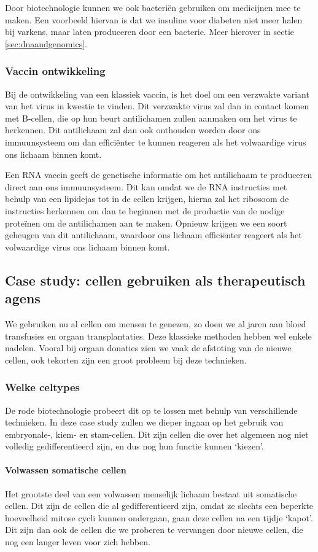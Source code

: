 \documentclass[a4paper,kul]{kulakarticle} %
\begin{document}
Door biotechnologie kunnen we ook bacteriën gebruiken om medicijnen mee te maken. Een voorbeeld hiervan is dat we insuline voor diabeten niet meer halen bij varkens, maar laten produceren door een bacterie. Meer hierover in sectie \ref{sec:dnaandgenomics}.
\subsubsection{Vaccin ontwikkeling}
Bij de ontwikkeling van een klassiek vaccin, is het doel om een verzwakte variant van het virus in kwestie te vinden. Dit verzwakte virus zal dan in contact komen met B-cellen, die op hun beurt antilichamen zullen aanmaken om het virus te herkennen. Dit antilichaam zal dan ook onthouden worden door ons immuunsysteem om dan efficiënter te kunnen reageren als het volwaardige virus ons lichaam binnen komt. 

Een RNA vaccin geeft de genetische informatie om het antilichaam te produceren direct aan ons immuunsysteem. Dit kan omdat we de RNA instructies met behulp van een lipidejas tot in de cellen krijgen, hierna zal het ribosoom  de instructies herkennen om dan te beginnen met de productie van de nodige proteïnen om de antilichamen aan te maken. Opnieuw krijgen we een soort geheugen van dit antilichaam, waardoor  ons lichaam efficiënter reageert als het volwaardige virus ons lichaam binnen komt.
\subsection[Case study]{Case study: cellen gebruiken als therapeutisch agens}
We gebruiken nu al cellen om mensen te genezen, zo doen we al jaren aan bloed transfusies en orgaan transplantaties. Deze klassieke methoden hebben wel enkele nadelen. Vooral bij orgaan donaties zien we vaak de afstoting van de nieuwe cellen, ook tekorten zijn een groot probleem bij deze technieken. 
\subsubsection{Welke celtypes}
De rode biotechnologie probeert dit op te lossen met behulp van verschillende technieken. In deze case study zullen we dieper ingaan op het gebruik van embryonale-, kiem- en stam-cellen. Dit zijn cellen die over het algemeen nog niet volledig gedifferentieerd zijn, en dus nog hun functie kunnen `kiezen'.
\paragraph{Volwassen somatische cellen}
Het grootste deel van een volwassen menselijk lichaam bestaat uit somatische cellen. Dit zijn de cellen die al gedifferentieerd zijn, omdat ze slechts een beperkte hoeveelheid mitose cycli kunnen ondergaan, gaan deze cellen na een tijdje `kapot'. Dit zijn dan ook de cellen die we proberen te vervangen door nieuwe cellen, die nog een langer leven voor zich hebben. 
\end{document}
